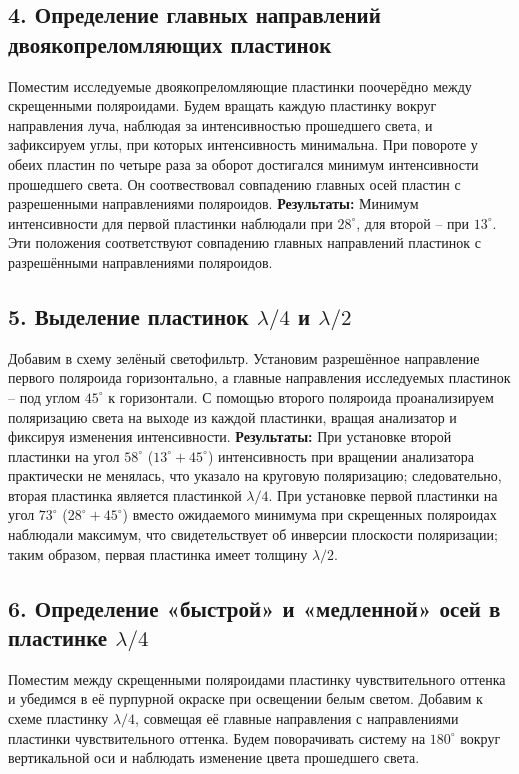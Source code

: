 \documentclass[a4paper]{article}
\begin{document}
\subsection*{4. Определение главных направлений двоякопреломляющих пластинок}
Поместим исследуемые двоякопреломляющие пластинки поочерёдно между скрещенными поляроидами. Будем вращать каждую пластинку вокруг направления луча, наблюдая за интенсивностью прошедшего света, и зафиксируем углы, при которых интенсивность минимальна. При повороте у обеих пластин по четыре раза за
оборот достигался минимум интенсивности прошедшего света. Он соотвествовал
совпадению главных осей пластин с разрешенными направлениями поляроидов.
\textbf{Результаты:} Минимум интенсивности для первой пластинки наблюдали при $28^\circ$, для второй -- при $13^\circ$. Эти положения соответствуют совпадению главных направлений пластинок с разрешёнными направлениями поляроидов.

\subsection*{5. Выделение пластинок $\lambda/4$ и $\lambda/2$}
Добавим в схему зелёный светофильтр. Установим разрешённое направление первого поляроида горизонтально, а главные направления исследуемых пластинок -- под углом $45^\circ$ к горизонтали. С помощью второго поляроида проанализируем поляризацию света на выходе из каждой пластинки, вращая анализатор и фиксируя изменения интенсивности.
\textbf{Результаты:} При установке второй пластинки на угол $58^\circ$ ($13^\circ + 45^\circ$) интенсивность при вращении анализатора практически не менялась, что указало на круговую поляризацию; следовательно, вторая пластинка является пластинкой $\lambda/4$. При установке первой пластинки на угол $73^\circ$ ($28^\circ + 45^\circ$) вместо ожидаемого минимума при скрещенных поляроидах наблюдали максимум, что свидетельствует об инверсии плоскости поляризации; таким образом, первая пластинка имеет толщину $\lambda/2$.

\subsection*{6. Определение «быстрой» и «медленной» осей в пластинке $\lambda/4$}
Поместим между скрещенными поляроидами пластинку чувствительного оттенка и убедимся в её пурпурной окраске при освещении белым светом. Добавим к схеме пластинку $\lambda/4$, совмещая её главные направления с направлениями пластинки чувствительного оттенка. Будем поворачивать систему на $180^\circ$ вокруг вертикальной оси и наблюдать изменение цвета прошедшего света.
\end{document}
